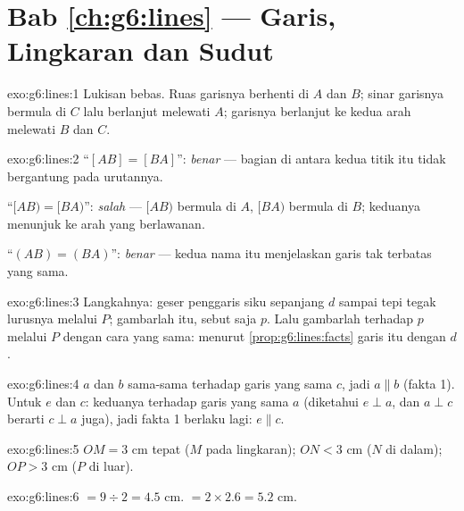 \section*{Bab \ref{ch:g6:lines} --- Garis, Lingkaran dan Sudut}

\begin{solution}{exo:g6:lines:1}
Lukisan bebas. Ruas garisnya berhenti di $A$ dan $B$; sinar garisnya
bermula di $C$ lalu berlanjut melewati $A$; garisnya berlanjut ke
kedua arah melewati $B$ dan $C$.
\end{solution}

\begin{solution}{exo:g6:lines:2}
``$[AB] = [BA]$'': \emph{benar} --- bagian di antara kedua titik itu
tidak bergantung pada urutannya.

``$[AB) = [BA)$'': \emph{salah} --- $[AB)$ bermula di $A$, $[BA)$
bermula di $B$; keduanya menunjuk ke arah yang berlawanan.

``$(AB) = (BA)$'': \emph{benar} --- kedua nama itu menjelaskan garis
tak terbatas yang sama.
\end{solution}

\begin{solution}{exo:g6:lines:3}
Langkahnya: geser penggaris siku sepanjang $d$ sampai tepi tegak
lurusnya melalui $P$; gambarlah  itu, sebut saja $p$.
Lalu gambarlah  terhadap $p$ melalui $P$ dengan cara
yang sama: menurut \cref{prop:g6:lines:facts} garis itu  dengan $d$.
\end{solution}

\begin{solution}{exo:g6:lines:4}
$a$ dan $b$ sama-sama  terhadap garis yang sama $c$, jadi
$a \parallel b$ (fakta 1). Untuk $e$ dan $c$: keduanya 
terhadap garis yang sama $a$ (diketahui $e \perp a$, dan $a \perp c$
berarti $c \perp a$ juga), jadi fakta 1 berlaku lagi: $e \parallel c$.
\end{solution}

\begin{solution}{exo:g6:lines:5}
$OM = 3$ cm tepat ($M$ pada lingkaran); $ON < 3$ cm ($N$ di dalam);
$OP > 3$ cm ($P$ di luar).
\end{solution}

\begin{solution}{exo:g6:lines:6}
 $= 9 \div 2 = 4.5$ cm. \quad {} $= 2 \times 2.6 = 5.2$ cm.
\end{solution}

